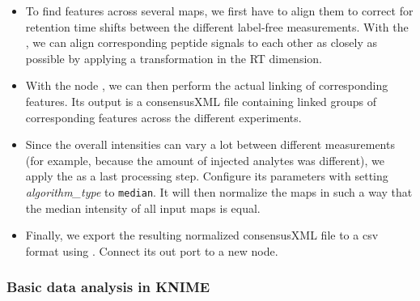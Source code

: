 \begin{itemize}
    \item To find features across several maps, we first have to align them to correct for retention time shifts between the different label-free measurements. With the  , we can align corresponding peptide signals to each other as closely as possible by applying a transformation in the RT dimension. 
    \item With the  node , we can then perform the actual linking of corresponding features. Its output is a consensusXML file containing linked groups of corresponding features across the different experiments.
    \item Since the overall intensities can vary a lot between different measurements (for example, because the amount of injected analytes was different), we apply the   as a last processing step. Configure its parameters with setting \textit{algorithm\_type} to \texttt{median}. It will then normalize the maps in such a way that the median intensity of all input maps is equal.
    \item Finally, we export the resulting normalized consensusXML file to a csv format using . Connect its out port to a new  node.
\end{itemize}

\subsubsection{Basic data analysis in KNIME}

